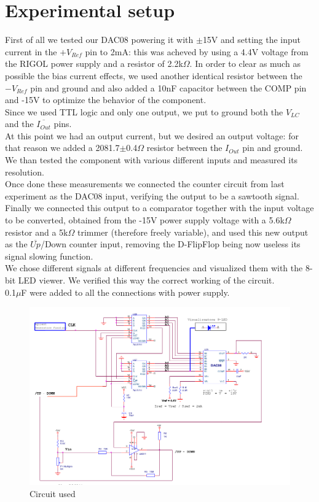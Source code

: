 \section{Experimental setup}
First of all we tested our DAC08 powering it with \(\pm\)15V and setting the input current in the $+V_{Ref}$ pin to 2mA: this was acheved by using a 4.4V voltage from the RIGOL power supply and a resistor of 2.2k\(\Omega\). In order to clear as much as possible the bias current effects, we used another identical resistor between the $-V_{Ref}$ pin and ground and also added a 10nF capacitor between the COMP pin and -15V to optimize the behavior of the component.\\
Since we used TTL logic and only one output, we put to ground both the $V_{LC}$ and the $\overline{I_{Out}}$ pins.\\
At this point we had an output current, but we desired an output voltage: for that reason we added a 2081.7\(\pm\)0.4\(\Omega\) resistor between the $I_{Out}$ pin and ground.\\
We than tested the component with various different inputs and measured its resolution.\\
Once done these measurements we connected the counter circuit from last experiment as the DAC08 input, verifying the output to be a sawtooth signal.\\
Finally we connected this output to a comparator together with the input voltage to be converted, obtained from the -15V power supply voltage with a 5.6k\(\Omega\) resistor and a 5k\(\Omega\) trimmer (therefore freely variable), and used this new output as the $\overline{Up}$/Down counter input, removing the D-FlipFlop being now useless its signal slowing function.\\
We chose different signals at different frequencies and visualized them with the 8-bit LED viewer. We verified this way the correct working of the circuit.\\
0.1\(\mu\)F were added to all the connections with power supply.\\

\begin{figure}[H]
\centering
\includegraphics[width=.8\textwidth]{12/circuit.png}
\caption{Circuit used}
\end{figure}

